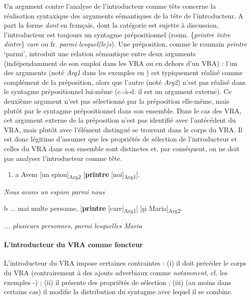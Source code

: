 Un argument contre l'analyse de l'introducteur comme tête concerne la réalisation syntaxique des arguments sémantiques de la tête de l'introducteur. A part la forme \textit{dont} en français, dont la catégorie est sujette à discussion, l'introducteur est toujours un syntagme prépositionnel (roum. \{\textit{printre {\textbar} între {\textbar} dintre}\}\textit{ care} ou fr. \textit{parmi lesquel(le)s}). Une préposition, comme le roumain \textit{printre} `parmi', introduit une relation sémantique entre deux arguments (indépendamment de son emploi dans les VRA ou en dehors d'un VRA) : l'un des arguments (noté \textit{Arg1} dans les exemples en )  est typiquement réalisé comme complément de la préposition, alors que l'autre (noté \textit{Arg2})  n'est pas réalisé dans le syntagme prépositionnel lui-même (c.-à-d. il est un argument externe). Ce deuxième argument n'est pas sélectionné par la préposition elle-même, mais plutôt par le syntagme prépositionnel dans son ensemble. Dans le cas des VRA, cet argument externe de la préposition n'est pas identifié avec l'antécédent du VRA, mais plutôt avec l'élément distingué se trouvant dans le corps du VRA. Il est donc légitime d'assumer que les propriétés de sélection de l'introducteur et celles du VRA dans son ensemble sont distinctes et, par conséquent, on ne doit pas analyser l'introducteur comme tête.  


\begin{enumerate}
\item \label{bkm:Ref296071594}a  Avem [un spion]\textsubscript{Arg2} [\textbf{printre} [noi]\textsubscript{Arg1}].  


\end{enumerate}
  \textit{Nous avons un espion parmi nous}

  b  ... mai multe persoane, [\textbf{printre} [care]\textsubscript{Arg1}] [şi Maria]\textsubscript{Arg2}.

{\itshape
... plusieurs personnes, parmi lesquelles Maria}

\paragraph[L'introducteur du VRA comme foncteur]{L'introducteur du VRA comme foncteur}
L'introducteur du VRA impose certaines contraintes : (i) il doit précéder le corps du VRA (contrairement à des ajouts adverbiaux comme \textit{notamment}, cf. les exemples -) ; (ii) il présente des propriétés de sélection ; (iii) (au moins dans certains cas) il modifie la distribution du syntagme avec lequel il se combine.


